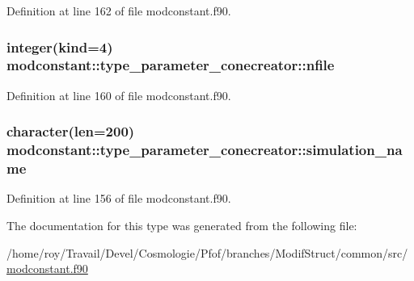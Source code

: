 Definition at line 162 of file modconstant.\-f90.

\hypertarget{structmodconstant_1_1type__parameter__conecreator_aed8367ffd7693e23e246b114eb3eef88}{
\subsubsection[{nfile}]{\setlength{\rightskip}{0pt plus 5cm}integer(kind=4) modconstant\-::type\-\_\-parameter\-\_\-conecreator\-::nfile}}\label{structmodconstant_1_1type__parameter__conecreator_aed8367ffd7693e23e246b114eb3eef88}


Definition at line 160 of file modconstant.\-f90.

\hypertarget{structmodconstant_1_1type__parameter__conecreator_af7518143511653280193e1cd3ecacb8c}{
\subsubsection[{simulation\-\_\-name}]{\setlength{\rightskip}{0pt plus 5cm}character(len=200) modconstant\-::type\-\_\-parameter\-\_\-conecreator\-::simulation\-\_\-name}}\label{structmodconstant_1_1type__parameter__conecreator_af7518143511653280193e1cd3ecacb8c}


Definition at line 156 of file modconstant.\-f90.



The documentation for this type was generated from the following file\-:\begin{DoxyCompactItemize}
\item 
/home/roy/\-Travail/\-Devel/\-Cosmologie/\-Pfof/branches/\-Modif\-Struct/common/src/\hyperlink{modconstant_8f90}{modconstant.\-f90}\end{DoxyCompactItemize}
